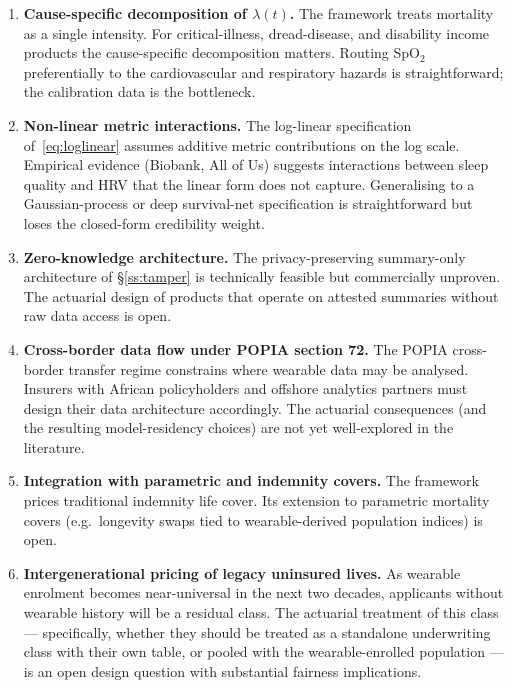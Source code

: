 \documentclass[11pt,a4paper]{article}
\theoremstyle{ia}
\newcommand{\1}{\mathbf{1}}
\begin{document}
\begin{enumerate}[leftmargin=*,nosep,topsep=4pt]
   \item \textbf{Cause-specific decomposition of $\lambda(t)$.}
         The framework treats mortality as a single intensity. For
         critical-illness, dread-disease, and disability income
         products the cause-specific decomposition matters.
         Routing SpO$_2$ preferentially to the cardiovascular and
         respiratory hazards is straightforward; the calibration
         data is the bottleneck.
   \item \textbf{Non-linear metric interactions.} The log-linear
         specification of~\eqref{eq:loglinear} assumes additive
         metric contributions on the log scale. Empirical
         evidence (Biobank, All of Us) suggests interactions
         between sleep quality and HRV that the linear form does
         not capture. Generalising to a Gaussian-process or deep
         survival-net specification is straightforward but loses
         the closed-form credibility weight.
   \item \textbf{Zero-knowledge architecture.} The privacy-preserving
         summary-only architecture of \S\ref{ss:tamper} is technically
         feasible but commercially unproven. The actuarial design of
         products that operate on attested summaries without raw data
         access is open.
   \item \textbf{Cross-border data flow under POPIA section 72.}
         The POPIA cross-border transfer regime constrains where
         wearable data may be analysed. Insurers with African
         policyholders and offshore analytics partners must
         design their data architecture accordingly. The actuarial
         consequences (and the resulting model-residency choices)
         are not yet well-explored in the literature.
   \item \textbf{Integration with parametric and indemnity covers.}
         The framework prices traditional indemnity life cover. Its
         extension to parametric mortality covers (e.g.\ longevity
         swaps tied to wearable-derived population indices) is open.
   \item \textbf{Intergenerational pricing of legacy uninsured
         lives.} As wearable enrolment becomes near-universal in the
         next two decades, applicants without wearable history will
         be a residual class. The actuarial treatment of this class
         --- specifically, whether they should be treated as a
         standalone underwriting class with their own table, or
         pooled with the wearable-enrolled population --- is an
         open design question with substantial fairness
         implications.
\end{enumerate}
\end{document}
